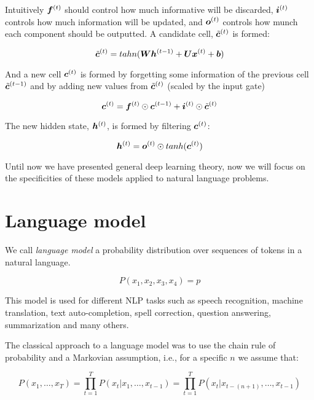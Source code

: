 Intuitively $\bm{f}^{(t)}$ should control how much informative will be discarded, $\bm{i}^{(t)}$ controls how much information will be updated, and $\bm{o}^{(t)}$ controls how munch each component should be outputted. A candidate cell, $\tilde{\bm{c}}^{(t)}$ is formed:

\begin{equation}
\tilde{\bm{c}}^{(t)} = tahn(\bm{W} \bm{h}^{(t-1)} + \bm{U} \bm{x}^{(t)} + \bm{b})
\end{equation}

And a new cell $\bm{c}^{(t)}$ is formed by forgetting some information of the previous cell $\tilde{\bm{c}}^{(t-1)}$ and by adding new values from $\tilde{\bm{c}}^{(t)}$ (scaled by the input gate)

\begin{equation}
\bm{c}^{(t)} = \bm{f}^{(t)} \odot \bm{c}^{(t-1)} + \bm{i}^{(t)} \odot \tilde{\bm{c}}^{(t)}
\end{equation}

The new hidden state, $\bm{h}^{(t)}$, is formed by filtering $\bm{c}^{(t)}$:

\begin{equation}
\bm{h}^{(t)} = \bm{o}^{(t)} \odot tanh(\bm{c}^{(t)})
\end{equation}

Until now we have presented general deep learning theory, now we will focus on the specificities of these models applied to natural language problems.


\section{Language model}

We call \textit{language model} a probability distribution over sequences of tokens in a natural language.

\[
P(x_1,x_2,x_3,x_4) = p
\]

This model is used for different NLP tasks such as speech recognition, machine translation, text auto-completion, spell correction, question answering, summarization and many others.

The classical approach to a language model was to use the chain rule of probability and a Markovian assumption, i.e., for a specific $n$ we assume that:

\begin{equation}
P(x_1, \dots, x_T) = \prod_{t=1}^{T} P(x_t \vert x_1, \dots, x_{t-1}) = \prod_{t=1}^{T} P(x_{t} \vert x_{t - (n+1)}, \dots, x_{t-1})
\end{equation} 


